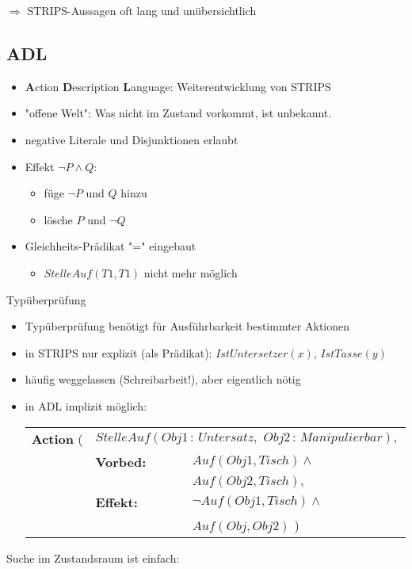 $\Rightarrow$ STRIPS-Aussagen oft lang und unübersichtlich

\subsection{ADL}

\begin{itemize}
\item \textbf{A}ction \textbf{D}escription \textbf{L}anguage: Weiterentwicklung von STRIPS
\item "{}offene Welt"{}: Was nicht im Zustand vorkommt, ist unbekannt.
\item negative Literale und Disjunktionen erlaubt
\item Effekt $\neg P \wedge Q$:
\begin{itemize}
\item füge $\neg P$ und $Q$ hinzu
\item lösche $P$ und $\neg Q$
\end{itemize}
\item Gleichheits-Prädikat "{}="{} eingebaut
\begin{itemize}
\item $StelleAuf(T1,T1)$ nicht mehr möglich
\end{itemize}
\end{itemize}
Typüberprüfung
\begin{itemize}
\item Typüberprüfung benötigt für Ausführbarkeit bestimmter Aktionen
\item in STRIPS nur explizit (als Prädikat): $IstUntersetzer(x)$, $IstTasse(y)$
\item häufig weggelassen (Schreibarbeit!), aber eigentlich nötig
\item in ADL implizit möglich:
\begin{center}
\begin{tabular}{lll}
\textbf{Action} ( & \multicolumn{2}{l}{$StelleAuf(Obj1 \, : \, Untersatz, \,\, Obj2 \, : \, Manipulierbar),$} \\
& \textbf{Vorbed:} & $Auf(Obj1, Tisch) \wedge$ \\ && $Auf(Obj2, Tisch),$ \\
& \textbf{Effekt:} & $\neg Auf(Obj1, Tisch) \wedge$ \\ && $Auf(Obj, Obj2)$ \qquad \quad )
\end{tabular}
\end{center}
\end{itemize}
Suche im Zustandsraum ist einfach:
